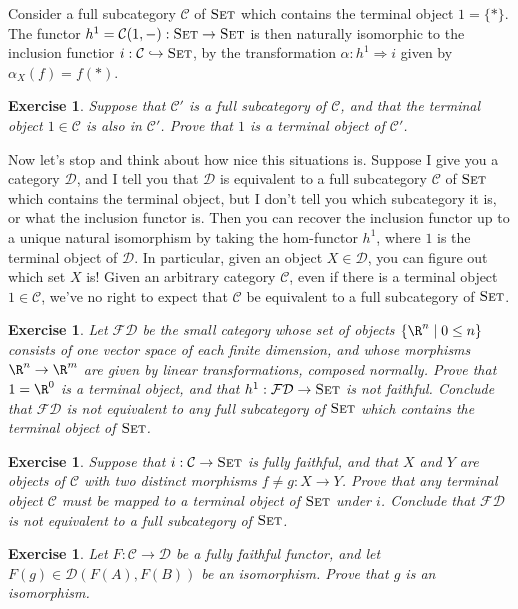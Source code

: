 \documentclass[11pt]{article}
\theoremstyle{plain}
\newtheorem{exrc}[thm]{Exercise}
\theoremstyle{definition}
\newcommand{\s}[1]{\mathcal{#1}}
\newcommand{\Set}{{\textsc{Set}}}
\begin{document}
Consider a full subcategory $\s{C}$ of $\Set$ which contains the terminal object $1 = \{*\}$. The functor $h^1 = \s{C}(1,-) : \Set \to \Set$ is then naturally isomorphic to the inclusion functior $i : \s{C} \hookrightarrow \Set$, by the transformation $\alpha : h^1 \Rightarrow i$ given by $\alpha_X(f) = f(*)$.

\begin{exrc}
    Suppose that $\s{C}'$ is a full subcategory of $\s{C}$, and that the terminal object $1 \in \s{C}$ is also in $\s{C}'$. Prove that $1$ is a terminal object of $\s{C}'$.
\end{exrc}

Now let's stop and think about how nice this situations is. Suppose I give you a category $\s{D}$, and I tell you that $\s{D}$ is equivalent to a full subcategory $\s{C}$ of $\Set$ which contains the terminal object, but I don't tell you which subcategory it is, or what the inclusion functor is. Then you can recover the inclusion functor up to a unique natural isomorphism by taking the hom-functor $h^1$, where $1$ is the terminal object of $\s{D}$. In particular, given an object $X \in \s{D}$, you can figure out which set $X$ is!
Given an arbitrary category $\s{C}$, even if there is a terminal object $1 \in \s{C}$, we've no right to expect that $\s{C}$ be equivalent to a full subcategory of $\Set$.

\begin{exrc}
    Let $\s{FD}$ be the small category whose set of objects $\{\R^n \mid 0 \le n\}$ consists of one vector space of each finite dimension, and whose morphisms $\R^n \to \R^m$ are given by linear transformations, composed normally. Prove that $1 = \R^0$ is a terminal object, and that $h^1 : \s{FD} \to \Set$ is not faithful. Conclude that $\s{FD}$ is not equivalent to any full subcategory of $\Set$ which contains the terminal object of $\Set$.
\end{exrc}

\begin{exrc}
    Suppose that $i : \s{C} \to \Set$ is fully faithful, and that $X$ and $Y$ are objects of $\s{C}$ with two distinct morphisms $f \neq g : X \to Y$. Prove that any terminal object $\s{C}$ must be mapped to a terminal object of $\Set$ under $i$. Conclude that $\s{FD}$ is not equivalent to a full subcategory of $\Set$.
\end{exrc}

\begin{exrc}
    Let $F : \s C \to \s D$ be a fully faithful functor, and let $F(g) \in \s D(F(A), F(B))$ be an isomorphism. Prove that $g$ is an isomorphism.
\end{exrc}
\end{document}
